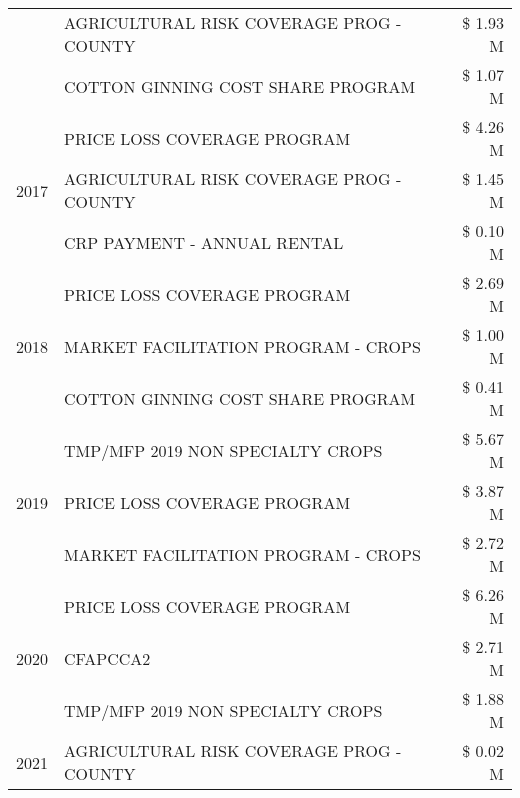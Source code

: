 \begin{tabular}{llr}
 & AGRICULTURAL RISK COVERAGE PROG - COUNTY & \$ 1.93 M \\
 & COTTON GINNING COST SHARE PROGRAM & \$ 1.07 M \\
\cline{1-3}
\multirow[t]{3}{*}{2017} & PRICE LOSS COVERAGE PROGRAM & \$ 4.26 M \\
 & AGRICULTURAL RISK COVERAGE PROG - COUNTY & \$ 1.45 M \\
 & CRP PAYMENT - ANNUAL RENTAL & \$ 0.10 M \\
\cline{1-3}
\multirow[t]{3}{*}{2018} & PRICE LOSS COVERAGE PROGRAM & \$ 2.69 M \\
 & MARKET FACILITATION PROGRAM - CROPS & \$ 1.00 M \\
 & COTTON GINNING COST SHARE PROGRAM & \$ 0.41 M \\
\cline{1-3}
\multirow[t]{3}{*}{2019} & TMP/MFP 2019 NON SPECIALTY CROPS & \$ 5.67 M \\
 & PRICE LOSS COVERAGE PROGRAM & \$ 3.87 M \\
 & MARKET FACILITATION PROGRAM - CROPS & \$ 2.72 M \\
\cline{1-3}
\multirow[t]{3}{*}{2020} & PRICE LOSS COVERAGE PROGRAM & \$ 6.26 M \\
 & CFAPCCA2 & \$ 2.71 M \\
 & TMP/MFP 2019 NON SPECIALTY CROPS & \$ 1.88 M \\
\cline{1-3}
2021 & AGRICULTURAL RISK COVERAGE PROG - COUNTY & \$ 0.02 M \\
\cline{1-3}
\bottomrule
\end{tabular}
